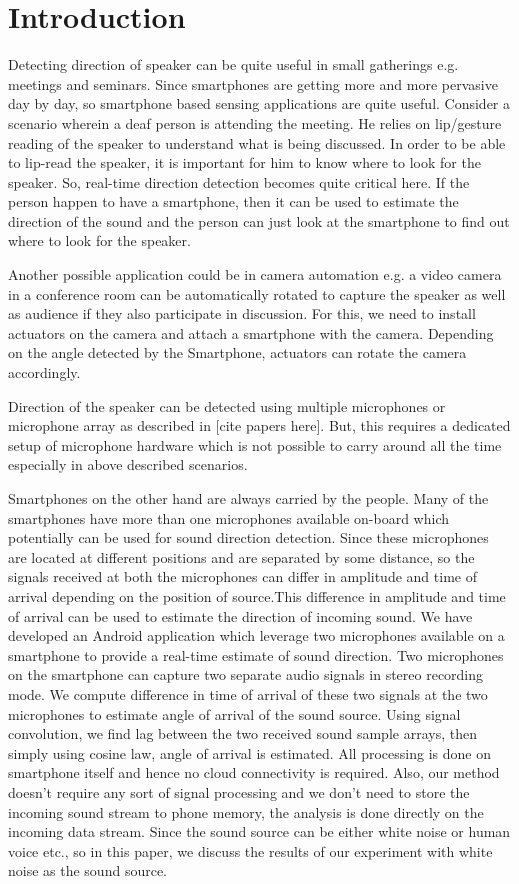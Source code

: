 \section{Introduction}
Detecting direction of speaker can be quite useful in small gatherings e.g. meetings and seminars. Since smartphones are getting more and more pervasive day by day, so smartphone based sensing applications are quite useful.  Consider a scenario wherein a deaf person is attending the meeting. He relies on lip/gesture reading of the speaker to understand what is being discussed. In order to be able to lip-read the speaker, it is important for him to know where to look for the speaker. So, real-time direction detection becomes quite critical here. If the person happen to have a smartphone, then it can be used to estimate the direction of the sound and the person can just look at the smartphone to find out where to look for the speaker.

Another possible application could be in camera automation e.g. a video camera in a conference room can be automatically rotated to capture the speaker as well as audience if they also participate in discussion. For this, we need to install actuators on the camera and attach a smartphone with the camera. Depending on the angle detected by the Smartphone, actuators can rotate the camera accordingly.

Direction of the speaker can be detected using multiple microphones or microphone array as described in \cite{everydaysounds} [cite papers here]. But, this requires a dedicated setup of microphone hardware which is not possible to carry around all the time especially in above described scenarios.

Smartphones on the other hand are always carried by the people. Many of the smartphones have more than one microphones available on-board which potentially can be used for sound direction detection. Since these microphones are located at different positions and are separated by some distance, so the signals received at both the microphones can differ in amplitude and time of arrival depending on the position of source.This difference in amplitude and time of arrival can be used to estimate the direction of incoming sound. We have developed an Android application which leverage two microphones available on a smartphone to provide a real-time estimate of sound direction. Two microphones on the smartphone can capture two separate audio signals in stereo recording mode. We compute difference in time of arrival of these two signals at the two microphones to estimate angle of arrival of the sound source. Using signal convolution, we find lag between the two received sound sample arrays, then simply using cosine law, angle of arrival is estimated. All processing is done on smartphone itself and hence no cloud connectivity is required. Also, our method doesn't require any sort of signal processing and we don't need to store the incoming sound stream to phone memory, the analysis is done directly on the incoming data stream. Since the sound source can be either white noise or human voice etc., so in this paper, we discuss the results of our experiment with white noise as the sound source.

